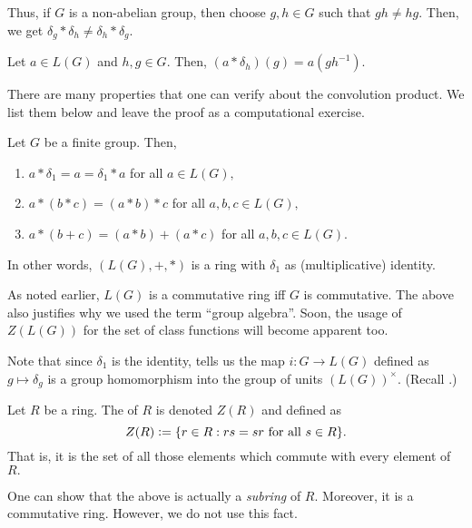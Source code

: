Thus, if $G$ is a non-abelian group, then choose $g, h \in G$ such that $gh \neq hg.$ Then, we get $\delta_g * \delta_h \neq \delta_h * \delta_g.$ 

\begin{prop} \label{prop:convole}
    Let $a \in L(G)$ and $h, g \in G.$ Then, $(a * \delta_h)(g) = a(gh^{-1}).$
\end{prop}

There are many properties that one can verify about the convolution product. We list them below and leave the proof as a computational exercise.

\begin{prop}
    Let $G$ be a finite group. Then,
    \begin{enumerate}
        \item $a * \delta_1 = a = \delta_1 * a$ for all $a \in L(G),$
        \item $a * (b * c) = (a * b) * c$ for all $a, b, c \in L(G),$
        \item $a * (b + c) = (a * b) + (a * c)$ for all $a, b, c \in L(G).$
    \end{enumerate}
    In other words, $(L(G), +, *)$ is a ring with $\delta_1$ as (multiplicative) identity.
\end{prop}

As noted earlier, $L(G)$ is a commutative ring iff $G$ is commutative. The above also justifies why we used the term ``group algebra''. Soon, the usage of $Z(L(G))$ for the set of class functions will become apparent too.

\begin{rem}
    Note that since $\delta_1$ is the identity,  tells us the map $i : G \to L(G)$ defined as $g \mapsto \delta_g$ is a group homomorphism into the group of units $(L(G))^\times.$ (Recall .)
\end{rem}

\begin{defn}
    Let $R$ be a ring. The  of $R$ is denoted $Z(R)$ and defined as
    \begin{equation*}
        Z(R) \vcentcolon= \{r \in R : rs = sr \text{ for all } s \in R\}.
    \end{equation*}
    That is, it is the set of all those elements which commute with every element of $R.$
\end{defn}

\begin{rem}
    One can show that the above is actually a \emph{subring} of $R.$ Moreover, it is a commutative ring. However, we do not use this fact.
\end{rem}

